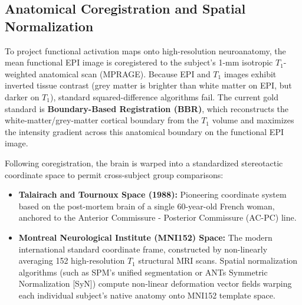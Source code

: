 \documentclass[11pt,a4paper]{article}
\begin{document}
\subsection{Anatomical Coregistration and Spatial Normalization}
To project functional activation maps onto high-resolution neuroanatomy, the mean functional EPI image is coregistered to the subject's 1-mm isotropic $T_1$-weighted anatomical scan (MPRAGE). Because EPI and $T_1$ images exhibit inverted tissue contrast (grey matter is brighter than white matter on EPI, but darker on $T_1$), standard squared-difference algorithms fail. The current gold standard is \textbf{Boundary-Based Registration (BBR)}, which reconstructs the white-matter/grey-matter cortical boundary from the $T_1$ volume and maximizes the intensity gradient across this anatomical boundary on the functional EPI image.

Following coregistration, the brain is warped into a standardized stereotactic coordinate space to permit cross-subject group comparisons:
\begin{itemize}
    \item \textbf{Talairach and Tournoux Space (1988):} Pioneering coordinate system based on the post-mortem brain of a single 60-year-old French woman, anchored to the Anterior Commissure - Posterior Commissure (AC-PC) line.
    \item \textbf{Montreal Neurological Institute (MNI152) Space:} The modern international standard coordinate frame, constructed by non-linearly averaging 152 high-resolution $T_1$ structural MRI scans. Spatial normalization algorithms (such as SPM's unified segmentation or ANTs Symmetric Normalization [SyN]) compute non-linear deformation vector fields warping each individual subject's native anatomy onto MNI152 template space.
\end{itemize}
\end{document}
